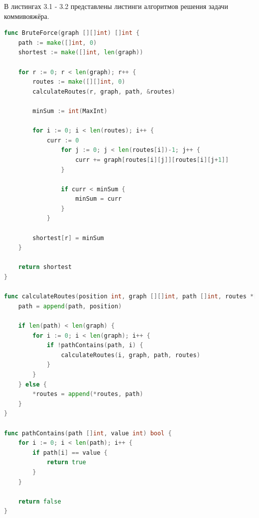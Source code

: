 \documentclass[12pt]{report}
\begin{document}
В листингах 3.1 - 3.2 представлены листинги алгоритмов решения задачи коммивояжёра.
	
\begin{lstlisting}[label=some-code,caption=Алгоритм полного перебора, language=go]
func BruteForce(graph [][]int) []int {
	path := make([]int, 0)
	shortest := make([]int, len(graph))
	
	for r := 0; r < len(graph); r++ {
		routes := make([][]int, 0)
		calculateRoutes(r, graph, path, &routes)
	
		minSum := int(MaxInt)
	
		for i := 0; i < len(routes); i++ {
			curr := 0
				for j := 0; j < len(routes[i])-1; j++ {
					curr += graph[routes[i][j]][routes[i][j+1]]
				}
	
				if curr < minSum {
					minSum = curr
				}
			}

		shortest[r] = minSum
	}

	return shortest
}

func calculateRoutes(position int, graph [][]int, path []int, routes *[][]int) {
	path = append(path, position)
	
	if len(path) < len(graph) {
		for i := 0; i < len(graph); i++ {
			if !pathContains(path, i) {
				calculateRoutes(i, graph, path, routes)
			}
		}
	} else {
		*routes = append(*routes, path)
	}
}

func pathContains(path []int, value int) bool {
	for i := 0; i < len(path); i++ {
		if path[i] == value {
			return true
		}
	}
	
	return false
}
\end{lstlisting}
	
\end{document}

